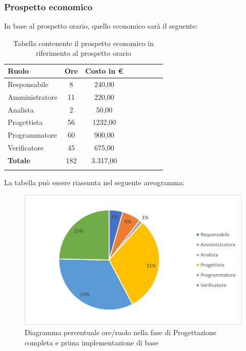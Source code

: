 			\subsubsection{Prospetto economico}
			In base al prospetto orario, quello economico sarà il seguente: 
			
			\begin{longtable}{|l|c|c|c|c|c|c|c|}
				\hline
				\rowcolor{lighter-grayer}
				\textbf{Ruolo} & \textbf{Ore} & \textbf{Costo in €} \\
				\hline
				\endfirsthead
				
				\hline
				Responsabile & 8 & 240,00\\
				\hline
				\hline
				Amministratore & 11 & 220,00\\
				\hline
				\hline
				Analista & 2 & 50,00\\
				\hline
				\hline
				Progettista & 56 & 1232,00\\
				\hline
				\hline
				Programmatore & 60 & 900,00\\
				\hline
				\hline
				Verificatore & 45 & 675,00\\
				\hline
				\hline
				\textbf{Totale} & 182 & 3.317,00\\
				\hline
				\rowcolor{white}
				\caption{Tabella contenente il prospetto economico in riferimento al prospetto orario}
			\end{longtable}
			\pagebreak
		
			La tabella può essere riassunta nel seguente areogramma:
			\begin{figure}[H]
				\centering
				\includegraphics[width=0.8\linewidth]{res/images/preventivo/5-2.png}
				\caption{Diagramma percentuale ore/ruolo nella fase di Progettazione completa e prima implementazione di base}
				\label{fig:diagramma costi ruolo fase progettazione completa e prima implementazione di base}
            \end{figure}

